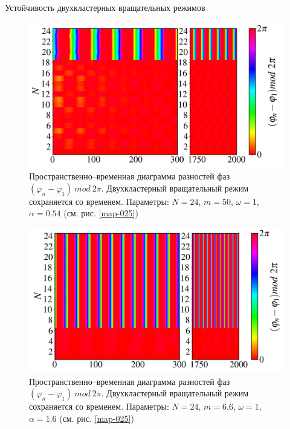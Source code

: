 \begin{chapter}{Устойчивость двухкластерных вращательных режимов}
	\begin{figure}[h!]
		\begin{center}
			\includegraphics[width=1\columnwidth]{pictures/Figure_M_50_A_0.54_O_1.png}
		\end{center}
		\caption{Пространственно--временная диаграмма разностей фаз $(\varphi_n - \varphi_1) \ mod \ 2\pi$.
		Двухкластерный вращательный режим сохраняется со временем.
		Параметры: $N=24$, $m = 50$, $\omega = 1$, $\alpha = 0.54$ (см. рис. \ref{map-025})}
		\label{st-c-3}
	\end{figure}

	\begin{figure}[h!]
		\begin{center}
			\includegraphics[width=1\columnwidth]{pictures/Figure_d.png}
		\end{center}
		\caption{Пространственно--временная диаграмма разностей фаз $(\varphi_n - \varphi_1) \ mod \ 2\pi$.
		Двухкластерный вращательный режим сохраняется со временем.
		Параметры: $N=24$, $m = 6.6$, $\omega = 1$, $\alpha = 1.6$ (см. рис. \ref{map-025})}
		\label{st-c-4}
	\end{figure}



\end{chapter}
